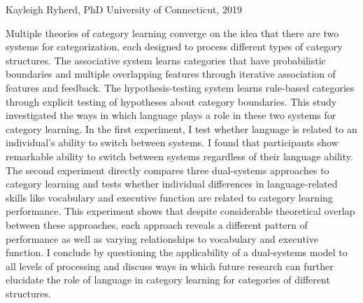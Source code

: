 \documentclass[../dissertation.tex]{subfiles}
\begin{document}
\begin{center}
\ptitle
\linebreak
Kayleigh Ryherd, PhD
\linebreak
University of Connecticut, 2019
\end{center}
Multiple theories of category learning converge on the idea that there are two systems for categorization, each designed to process different types of category structures. The associative system learns categories that have probabilistic boundaries and multiple overlapping features through iterative association of features and feedback. The hypothesis-testing system learns rule-based categories through explicit testing of hypotheses about category boundaries. This study investigated the ways in which language plays a role in these two systems for category learning. In the first experiment, I test whether language is related to an individual's ability to switch between systems. I found that participants show remarkable ability to switch between systems regardless of their language ability. The second experiment directly compares three dual-systems approaches to category learning and tests whether individual differences in language-related skills like vocabulary and executive function are related to category learning performance. This experiment shows that despite considerable theoretical overlap between these approaches, each approach reveals a different pattern of performance as well as varying relationships to vocabulary and executive function. I conclude by questioning the applicability of a dual-systems model to all levels of processing and discuss ways in which future research can further elucidate the role of language in category learning for categories of different structures.
\end{document}
